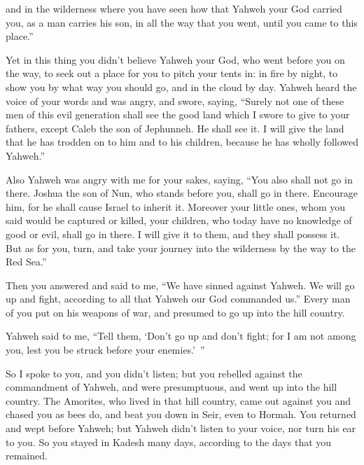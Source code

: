 {and in the wilderness where you have seen how that Yahweh your God carried you, as a man carries his son, in all the way that you went, until you came to this place.”
\par }{\PP {}Yet in this thing you didn’t believe Yahweh your God,
who went before you on the way, to seek out a place for you to pitch your tents in: in fire by night, to show you by what way you should go, and in the cloud by day.
Yahweh heard the voice of your words and was angry, and swore, saying,
“Surely not one of these men of this evil generation shall see the good land which I swore to give to your fathers,
except Caleb the son of Jephunneh. He shall see it. I will give the land that he has trodden on to him and to his children, because he has wholly followed Yahweh.”
\par }{\PP {}Also Yahweh was angry with me for your sakes, saying, “You also shall not go in there.
Joshua the son of Nun, who stands before you, shall go in there. Encourage him, for he shall cause Israel to inherit it.
Moreover your little ones, whom you said would be captured or killed, your children, who today have no knowledge of good or evil, shall go in there. I will give it to them, and they shall possess it.
But as for you, turn, and take your journey into the wilderness by the way to the Red Sea.”
\par }{\PP {}Then you answered and said to me, “We have sinned against Yahweh. We will go up and fight, according to all that Yahweh our God commanded us.” Every man of you put on his weapons of war, and presumed to go up into the hill country.
\par }{\PP {}Yahweh said to me, “Tell them, ‘Don’t go up and don’t fight; for I am not among you, lest you be struck before your enemies.’ ”
\par }{\PP {}So I spoke to you, and you didn’t listen; but you rebelled against the commandment of Yahweh, and were presumptuous, and went up into the hill country.
The Amorites, who lived in that hill country, came out against you and chased you as bees do, and beat you down in Seir, even to Hormah.
You returned and wept before Yahweh; but Yahweh didn’t listen to your voice, nor turn his ear to you.
So you stayed in Kadesh many days, according to the days that you remained.

}
